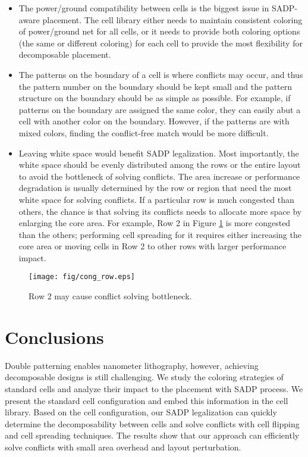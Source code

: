 \begin{itemize}
  \item The power/ground compatibility between cells is the biggest issue in SADP-aware placement. The cell library either needs to maintain consistent coloring of power/ground net for all cells, or it needs to provide both coloring options (the same or different coloring) for each cell to provide the most flexibility for decomposable placement.
  \item The patterns on the boundary of a cell is where conflicts may occur, and thus the pattern number on the boundary should be kept small and the pattern structure on the boundary should be as simple as possible. For example, if patterns on the boundary are assigned the same color, they can easily abut a cell with another color on the boundary. However, if the patterns are with mixed colors, finding the conflict-free match would be more difficult.
  \item Leaving white space would benefit SADP legalization. Most importantly, the white space should be evenly distributed among the rows or the entire layout to avoid the bottleneck of solving conflicts. The area increase or performance degradation is usually determined by the row or region that need the most white space for solving conflicts. If a particular row is much congested than others, the chance is that solving its conflicts needs to allocate more space by enlarging the core area. For example, Row 2 in Figure \ref{fig:cong_row} is more congested than the others; performing cell spreading for it requires either increasing the core area or moving cells in Row 2 to other rows with larger performance impact.
\end{itemize}

\begin{figure}[t]
 \centering
\texttt{[image: fig/cong\_row.eps]}
\caption{Row 2 may cause conflict solving bottleneck.}
  \label{fig:cong_row}
\end{figure}

\section{Conclusions} \label{sec:conclude}
Double patterning enables nanometer lithography, however, achieving decomposable designs is still challenging. We study the coloring strategies of standard cells and analyze their impact to the placement with SADP process. We present the standard cell configuration and embed this information in the cell library. Based on the cell configuration, our SADP legalization can quickly determine the decomposability between cells and solve conflicts with cell flipping and cell spreading techniques. The results show that our approach can efficiently solve conflicts with small area overhead and layout perturbation.

